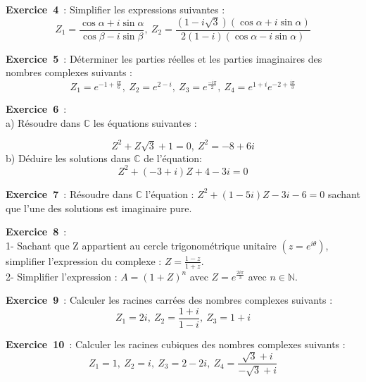 \documentclass[12pt, a4paper]{article}
\begin{document}
{\bf Exercice~4}~: Simplifier les expressions suivantes :
\begin{equation*}
Z_{1}=\frac{\cos\alpha+i\sin\alpha}{\cos\beta-i\sin\beta},~Z_{2}=\frac{(1-i\sqrt{3})(\cos\alpha+i\sin\alpha)}{2(1-i)(\cos\alpha-i\sin\alpha)}
\end{equation*}

{\bf Exercice~5}~: Déterminer les parties réelles et les parties imaginaires des nombres complexes suivants :
\begin{equation*}
Z_{1} = e^{-1+\frac{i\pi}{6}},~Z_{2}=e^{2-i},~Z_{3}=e^{\frac{-i\pi}{2}},~Z_{4}=e^{1+i}e^{-2+\frac{i\pi}{3}}
\end{equation*}

{\bf Exercice~6}~: \\
a) Résoudre dans $\mathbb{C}$ les équations suivantes :

\begin{equation*}
Z^2+Z\sqrt{3}+1=0,~Z^2=-8+6i
\end{equation*}
b) Déduire les solutions dans $\mathbb{C}$ de l'équation:
\begin{equation*}
Z^2+(-3+i)Z+4-3i=0
\end{equation*}

{\bf Exercice~7}~: Résoudre dans $\mathbb{C}$ l'équation : 
$Z^2+(1-5i)Z-3i-6=0$ sachant que l'une des solutions est imaginaire pure.

{\bf Exercice~8}~:\\ 1- Sachant que Z appartient au cercle trigonométrique unitaire $(z = e^{i\theta})$, simplifier l'expression du complexe : $Z = \frac{1-z}{1+z}$.
\\
2- Simplifier l'expression : $A = (1+Z)^n$ avec $Z=e^\frac{2i\pi}{3}$ avec $n\in\mathbb{N}$.

{\bf Exercice~9}~: Calculer les racines carrées des nombres complexes suivants :
\begin{equation*}
Z_{1}=2i,~Z_{2}=\frac{1+i}{1-i},~Z_{3}=1+i
\end{equation*}

{\bf Exercice~10}~: Calculer les racines cubiques des nombres complexes suivants :
\begin{equation*}
Z_{1}=1,~Z_{2}=i,~Z_{3}=2-2i,~Z_{4}=\frac{\sqrt{3}+i}{-\sqrt{3}+i}
\end{equation*}
\end{document}
